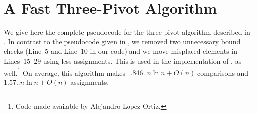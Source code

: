 \documentclass[prodmode,acmtalg]{acmsmall}
\begin{document}
\begin{algorithm}
\end{algorithm}

\section{A Fast Three-Pivot Algorithm}\label{app:sec:algo:three:pivot}
We give here the complete pseudocode for the three-pivot algorithm described in \cite{Kushagra14}. 
In contrast to the pseudocode given in \cite[Algorithm A.1.1]{Kushagra14}, we removed two unnecessary
bound checks (Line~$5$ and Line~$10$ in our code) and we move misplaced elements
in Lines~$15$--$29$ using less assignments. This is used in the implementation
of \cite{Kushagra14}, as well.\footnote{Code made available by Alejandro
L{\'o}pez-Ortiz.} On average, this algorithm makes $1.846..n \ln n + O(n)$
comparisons 
and $1.57.. n \ln n + O(n)$ assignments. 
\end{document}
